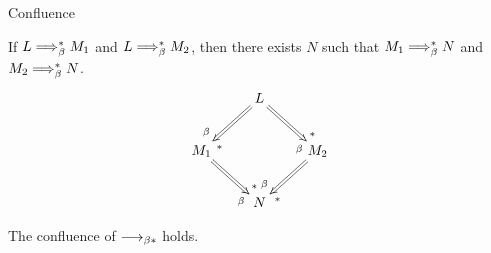 \begin{frame}{Confluence}
  \begin{theorem}
    If $L \Longrightarrow_{\beta}^* M_1$ and $L \Longrightarrow_{\beta}^* M_2$, then there exists $N$ such that $M_1 \Longrightarrow_{\beta}^* N$ and $M_2 \Longrightarrow_{\beta}^* N$.
    \[
      \xymatrix{
        & L \ar@{=>}[rd]^(.8){*}_(.8){\beta} \ar@{=>}[ld]^(.8){*}_(.8){\beta} \\
        M_1 \ar@{=>}[rd]^(.8){*}_(.8){\beta} & & M_2 \ar@{=>}[ld]^(.8){*}_(.8){\beta} \\
            & N
      }
    \]
  \end{theorem}
  \begin{corollary}
    The confluence of $\longrightarrow_{\beta*}$ holds. 
    
  \end{corollary}
  
\end{frame}
